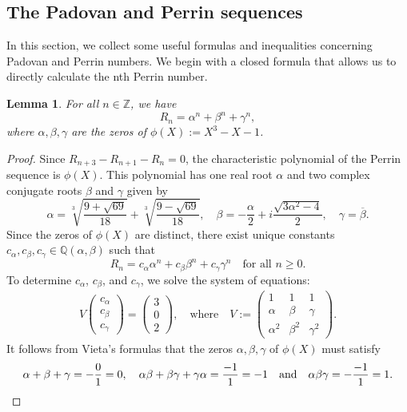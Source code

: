 \documentclass[11pt,a4paper]{article}
\newtheorem{lemma}[theorem]{Lemma}
\numberwithin{equation}{section}
\numberwithin{table}{section}
\numberwithin{figure}{section}
\begin{document}
\subsection{The Padovan and Perrin sequences}

In this section, we collect some useful formulas and inequalities concerning Padovan and Perrin numbers. We begin with a closed formula that allows us to directly calculate the nth Perrin number.
\begin{lemma}\label{eq:binet_perrin}
For all $n\in \mathbb{Z}$, we have
\begin{equation*}
	R_n = \alpha^n + \beta^n + \gamma^n,
\end{equation*}
where $\alpha,\beta,\gamma$ are the zeros of $\phi(X):=X^{3}-X-1$.
\end{lemma}
\begin{proof}
Since $R_{n+3}-R_{n+1}-R_{n}=0$, the characteristic polynomial of the Perrin sequence is $\phi(X)$. This polynomial has one real root $\alpha$ and two complex conjugate roots $\beta$ and $\gamma$ given by
$$
\alpha=\sqrt[3]{\frac{9+\sqrt{69}}{18}}+\sqrt[3]{\frac{9-\sqrt{69}}{18}},\quad \beta=-\frac{\alpha}{2}+i\frac{\sqrt{3\alpha^{2}-4}}{2},\quad \gamma =\overline{\beta}.
$$
Since the zeros of $\phi(X)$ are distinct, there exist unique constants $c_{\alpha},c_{\beta},c_{\gamma}\in \mathbb{Q}(\alpha,\beta)$ such that  
$$
R_{n}=c_{\alpha}\alpha^{n}+c_{\beta}\beta^{n}+c_{\gamma}\gamma^{n}\quad \text{for all }n\ge 0.
$$
To determine $c_{\alpha}$, $c_{\beta}$, and $c_{\gamma}$, we solve the system of equations:
\begin{align*}
V\begin{pmatrix}c_{\alpha}\\c_{\beta}\\c_{\gamma}\end{pmatrix}=\begin{pmatrix}3\\0\\2\end{pmatrix},\quad \text{where}\quad V:=\begin{pmatrix}1&1&1\\ \alpha &\beta &\gamma \\ \alpha^{2} & \beta^{2} &\gamma^{2}\end{pmatrix}.
\end{align*}
It follows from Vieta's formulas that the zeros $\alpha,\beta,\gamma$ of $\phi(X)$ must satisfy 
$$
\alpha +\beta +\gamma= -\frac{0}{1}=0,\quad \alpha \beta +\beta \gamma +\gamma \alpha=\frac{-1}{1}=-1\quad {\text{\rm and}} \quad \alpha \beta \gamma =-\frac{-1}{1}=1.
$$
\end{proof}
\end{document}
